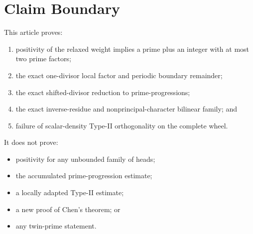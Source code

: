 \section{Claim Boundary}

This article proves:

\begin{enumerate}
\item positivity of the relaxed weight implies a prime plus an integer with at
   most two prime factors;
\item the exact one-divisor local factor and periodic boundary remainder;
\item the exact shifted-divisor reduction to prime-progressions;
\item the exact inverse-residue and nonprincipal-character bilinear family; and
\item failure of scalar-density Type-II orthogonality on the complete wheel.
\end{enumerate}

It does not prove:

\begin{itemize}
\item positivity for any unbounded family of heads;
\item the accumulated prime-progression estimate;
\item a locally adapted Type-II estimate;
\item a new proof of Chen's theorem; or
\item any twin-prime statement.
\end{itemize}
